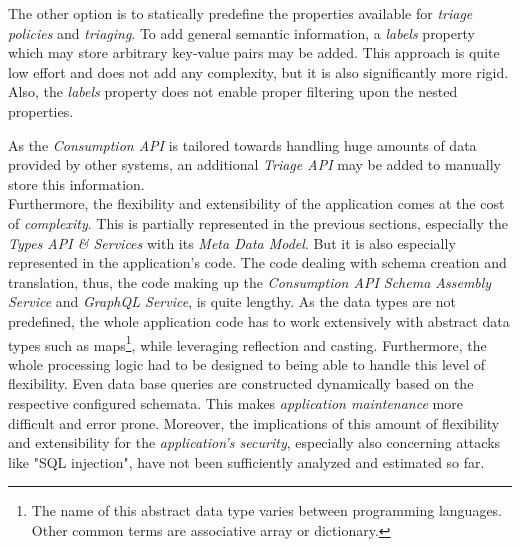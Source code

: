 The other option is to statically predefine the properties available for \emph{triage policies} and \emph{triaging}. To add general semantic information, a \emph{labels} property which may store arbitrary key-value pairs may be added. This approach is quite low effort and does not add any complexity, but it is also significantly more rigid. Also, the \emph{labels} property does not enable proper filtering upon the nested properties.\par
As the \emph{Consumption API} is tailored towards handling huge amounts of data provided by other systems, an additional \emph{Triage API} may be added to manually store this information.\\

Furthermore, the flexibility and extensibility of the application comes at the cost of \emph{complexity}. This is partially represented in the previous sections, especially the \emph{Types API \& Services} with its \emph{Meta Data Model}. But it is also especially represented in the application's code. The code dealing with schema creation and translation, thus, the code making up the \emph{Consumption API Schema Assembly Service} and \emph{GraphQL Service}, is quite lengthy. As the data types are not predefined, the whole application code has to work extensively with abstract data types such as maps\footnote{The name of this abstract data type varies between programming languages. Other common terms are associative array or dictionary.}, while leveraging reflection and casting. Furthermore, the whole processing logic had to be designed to being able to handle this level of flexibility. Even data base queries are constructed dynamically based on the respective configured schemata. This makes \emph{application maintenance} more difficult and error prone. Moreover, the implications of this amount of flexibility and extensibility for the \emph{application's security}, especially also concerning attacks like "SQL injection", have not been sufficiently analyzed and estimated so far. 